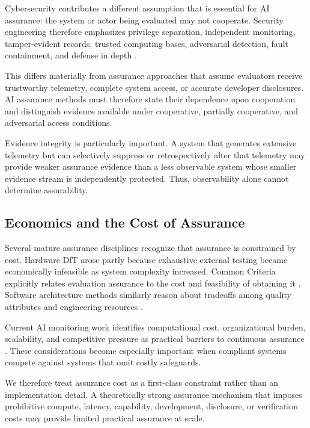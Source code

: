 Cybersecurity contributes a different assumption that is essential for AI assurance: the system or actor being evaluated may not cooperate.
Security engineering therefore emphasizes privilege separation, independent monitoring,
tamper-evident records, trusted computing bases,
adversarial detection, fault containment, and defense in depth \cite{anderson2020security, saltzer1975protection}.

This differs materially from assurance approaches that assume evaluators receive trustworthy telemetry, complete system access, or accurate developer disclosures.
AI assurance methods must therefore state their dependence upon cooperation and distinguish evidence available under cooperative,
partially cooperative, and adversarial access conditions.

Evidence integrity is particularly important.
A system that generates extensive telemetry but can
selectively suppress or retrospectively alter that telemetry may provide weaker assurance evidence than a less observable system
whose smaller evidence stream is independently protected. Thus, observability alone cannot determine assurability.

\subsection{Economics and the Cost of Assurance}

Several mature assurance disciplines recognize that assurance is constrained by cost.
Hardware DfT arose partly because exhaustive external testing became economically infeasible as system complexity increased.
Common Criteria explicitly relates evaluation assurance to the cost and feasibility of obtaining it \cite{commonCriteria2022part5}.
Software architecture methods similarly reason about tradeoffs among quality attributes and engineering resources \cite{bass2021softwarearchitecture}.

Current AI monitoring work identifies computational cost, organizational burden, scalability, and competitive pressure
as practical barriers to continuous assurance \cite{nist2026monitoring}. These considerations become especially important when compliant systems compete against systems that omit costly safeguards.

We therefore treat assurance cost as a first-class constraint rather than an implementation detail.
A theoretically strong assurance mechanism that imposes prohibitive compute, latency, capability,
development, disclosure, or verification costs may provide limited practical assurance at scale.

